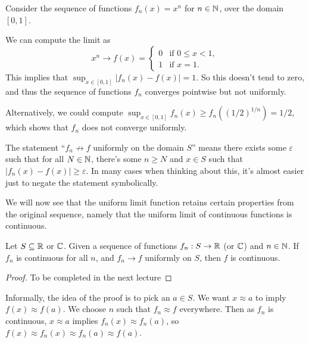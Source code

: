 \documentclass[a4paper]{scrartcl}
\begin{document}
\begin{example}
    Consider the sequence of functions $f_n(x) = x^n$ for $n \in \mathbb{N}$, over the domain $[0, 1]$.

    We can compute the limit as
    $$
    x^n \rightarrow f(x) = \begin{cases}
        0 &\mbox{if } 0 \leq x < 1, \\
        1 &\mbox{if } x = 1.
       \end{cases}
    $$
    This implies that $\sup_{x \in [0, 1]} |f_n(x) - f(x)| = 1$. So this doesn't tend to zero, and thus the sequence of functions $f_n$ converges pointwise but not uniformly.

    Alternatively, we could compute $\sup_{x \in [0, 1]} f_n(x) \geq f_n((1/2)^{1/n}) = 1/2$, which shows that $f_n$ does not converge uniformly.
\end{example}

\begin{remark}
    The statement ``$f_n \not \rightarrow f$ uniformly on the domain $S$'' means there exists some $\varepsilon$ such that for all $N \in \mathbb{N}$, there's some $n \geq N$ and $x \in S$ such that $|f_n(x) - f(x)| \geq \varepsilon$. In many cases when thinking about this, it's almost easier just to negate the statement symbolically.
\end{remark}

We will now see that the uniform limit function retains certain properties from the original sequence, namely that the uniform limit of continuous functions is continuous.

\begin{theorem}
    Let $S \subseteq \mathbb{R}$ or $\mathbb{C}$. Given a sequence of functions $f_n : S \rightarrow \mathbb{R}$ (or $\mathbb{C}$) and $n \in \mathbb{N}$. If $f_n$ is continuous for all $n$, and $f_n \rightarrow f$ uniformly on $S$, then $f$ is continuous.
\end{theorem}
\begin{proof}
    To be completed in the next lecture
\end{proof}

Informally, the idea of the proof is to pick an $a \in S$. We want $x \approx a$ to imply $f(x) \approx f(a)$. We choose $n$ such that $f_n \approx f$ everywhere. Then as $f_n$ is continuous, $x \approx a$ implies $f_n(x) \approx f_n(a)$, so $f(x) \approx f_n(x) \approx f_n(a) \approx f(a)$.
\end{document}
